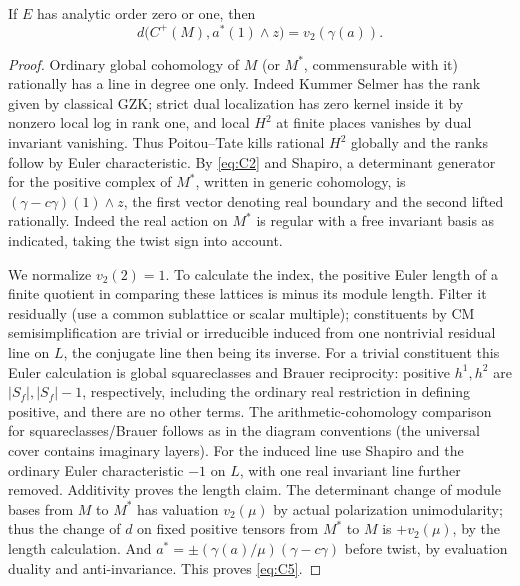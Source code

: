 \begin{lemma}\label{cm:lattice-index}
If \(E\) has analytic order zero or one, then
\[
 d\bigl(C^+(M),a^*(1)\wedge z\bigr)=v_2(\gamma(a)).
 \tag{C5}\label{eq:C5}
\]
\end{lemma}

\begin{proof}
Ordinary global cohomology of \(M\) (or \(M^*\), commensurable with it) rationally has a line
in degree one only. Indeed Kummer Selmer has the rank given by classical GZK; strict dual
localization has zero kernel inside it by nonzero local log in rank one, and local \(H^2\) at
finite places vanishes by dual invariant vanishing. Thus Poitou--Tate kills rational \(H^2\)
globally and the ranks follow by Euler characteristic. By \eqref{eq:C2} and Shapiro, a
determinant generator for the positive complex of \(M^*\), written in generic cohomology, is
\((\gamma-c\gamma)(1)\wedge z\), the first vector denoting real boundary and the second lifted
rationally. Indeed the real action on \(M^*\) is regular with a free invariant basis as
indicated, taking the twist sign into account.

We normalize \(v_2(2)=1\). To calculate the index, the positive Euler length of a finite
quotient in comparing these lattices is minus its module length. Filter it residually (use a
common sublattice or scalar multiple); constituents by CM semisimplification are trivial or
irreducible induced from one nontrivial residual line on \(L\), the conjugate line then being
its inverse. For a trivial constituent this Euler calculation is global squareclasses and
Brauer reciprocity: positive \(h^1,h^2\) are \(|S_f|, |S_f|-1\), respectively, including the
ordinary real restriction in defining positive, and there are no other terms. The
arithmetic-cohomology comparison for squareclasses/Brauer follows as in the diagram
conventions (the universal cover contains imaginary layers). For the induced line use Shapiro
and the ordinary Euler characteristic \(-1\) on \(L\), with one real invariant line further
removed. Additivity proves the length claim. The determinant change of module bases from \(M\)
to \(M^*\) has valuation \(v_2(\mu)\) by actual polarization unimodularity; thus the change of
\(d\) on fixed positive tensors from \(M^*\) to \(M\) is \(+v_2(\mu)\), by the length
calculation. And \(a^*=\pm(\gamma(a)/\mu)(\gamma-c\gamma)\) before twist, by evaluation
duality and anti-invariance. This proves \eqref{eq:C5}.
\end{proof}

